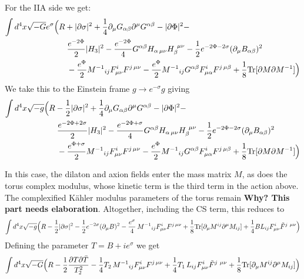 \documentclass[11pt, class=article, crop=false]{standalone}
\begin{document}
\begin{enumerate}
	For the IIA side we get:
	\[
	\begin{aligned}
		\int d^4 x \sqrt{-G} e^{\sigma } \Big(&R + |\partial \sigma|^2 + \frac14 \partial_\mu G_{\alpha \beta} \partial^\mu G^{\alpha \beta} - |\partial \Phi|^2 - \\
		&\quad  \frac{e^{-2\Phi}}{2} |H_3|^2 - \frac{e^{-2\Phi}}{4} G^{\alpha \beta} H_{\alpha\, \mu \nu} H_\beta^{\ \mu \nu} - \frac12 e^{-2\Phi -2 \sigma} (\partial_\mu B_{\alpha \beta})^2\\
		& \quad - \frac{e^{\Phi}}{2} {M^{-1}}_{ij} F_{\mu \nu}^i F^{j\, \mu \nu}
		- \frac{e^{\Phi}}{2} {M^{-1}}_{ij} G^{\alpha \beta} F_{\mu \alpha}^i F^{j\, \mu \beta}
		+ \frac18 \mathrm{Tr}[\partial M \partial M^{-1}]  \Big)
	\end{aligned}
	\]
	We take this to the Einstein frame $g \to e^{-\sigma} g$ giving
	\[
	\begin{aligned}
		\int d^4 x \sqrt{-g} \Big(&R - \frac12 |\partial \sigma|^2 + \frac14 \partial_\mu G_{\alpha \beta} \partial^\mu G^{\alpha \beta} - |\partial \Phi|^2 - \\
		&\quad  \frac{e^{-2\Phi + 2 \sigma}}{2} |H_3|^2 - \frac{e^{-2\Phi + \sigma}}{4} G^{\alpha \beta} H_{\alpha\, \mu \nu} H_\beta^{\ \mu \nu} - \frac12 e^{-2\Phi -2 \sigma} (\partial_\mu B_{\alpha \beta})^2\\
		& \quad - \frac{e^{\Phi + \sigma}}{2} {M^{-1}}_{ij} F_{\mu \nu}^i F^{j\, \mu \nu}
		- \frac{e^{\Phi}}{2} {M^{-1}}_{ij} G^{\alpha \beta} F_{\mu \alpha}^i F^{j\, \mu \beta}
		+ \frac18 \mathrm{Tr}[\partial M \partial M^{-1}]  \Big)
	\end{aligned}
	\]
	
	In this case, the dilaton and axion fields enter the mass matrix $M$, as does the torus complex modulus, whose kinetic term is the third term in the action above. The complexified K\"ahler modulus parameters of the torus remain \textbf{Why? This part needs elaboration}. Altogether, including the CS term, this reduces to
	\[
		\int d^4 x \sqrt{-g} \Big(R - \frac12 |\partial \sigma|^2 - \frac12 e^{-2\sigma} (\partial_\mu B)^2  - \frac{e^\sigma}{4} \, {M^{-1}}_{ij} F_{\mu \nu}^i F^{j\, \mu \nu}  + \frac18 \mathrm{Tr}[\partial_\mu M^{ij} \partial^\mu M_{ij}] + \frac14 B L_{ij} F_{\mu \nu}^i \tilde F^{j\ \mu \nu}  \Big)
	\] 
	Defining the parameter $T = B + i e^\sigma$ we get
	\[
		\int d^4 x \sqrt{-G} \Big(R - \frac12 \frac{\partial T \partial \bar T}{T_2^2} - \frac{1}{4} T_2\, {M^{-1}}_{ij} F_{\mu \nu}^i F^{j\, \mu \nu}  + \frac14 T_1\, L_{ij} F_{\mu \nu}^i \tilde F^{j\ \mu \nu}  + \frac18 \mathrm{Tr}[\partial_\mu M^{ij} \partial^\mu M_{ij}] \Big)
	\]
	

\end{enumerate}
\end{document}
